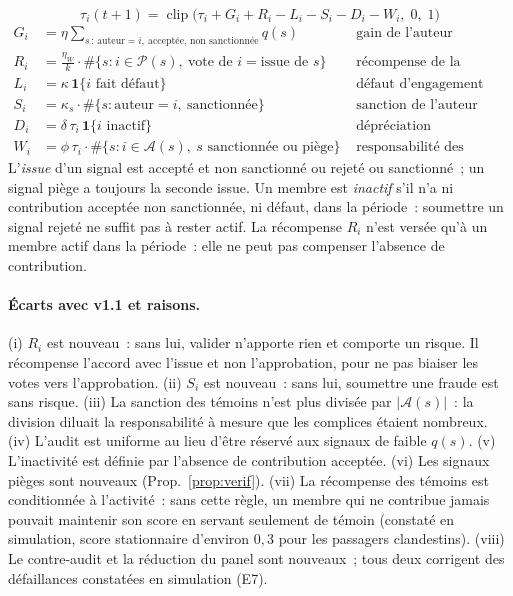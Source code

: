 \documentclass[11pt,a4paper]{article}
\theoremstyle{plain}
\theoremstyle{definition}
\theoremstyle{remark}
\newcommand{\clip}{\operatorname{clip}}
\newcommand{\1}{\mathbf{1}}
\begin{document}
\begin{equation}
\boxed{\tau_i(t+1)=\clip\bigl(\tau_i+G_i+R_i-L_i-S_i-D_i-W_i,\;0,\;1\bigr)}
\label{eq:dyn}
\end{equation}
\begin{align}
G_i&=\eta\textstyle\sum_{s\,:\,\text{auteur}=i,\ \text{acceptée, non sanctionnée}}q(s)
  &&\text{gain de l'auteur}\label{eq:G}\\
R_i&=\tfrac{\eta_W}{k}\cdot\#\{s: i\in\mathcal{P}(s),\ \text{vote de } i=\text{issue de } s\}
  &&\text{récompense de la majorité}\label{eq:R}\\
L_i&=\kappa\,\1\{i\text{ fait défaut}\}&&\text{défaut d'engagement}\label{eq:L}\\
S_i&=\kappa_s\cdot\#\{s:\text{auteur}=i,\ \text{sanctionnée}\}&&\text{sanction de l'auteur}\label{eq:S}\\
D_i&=\delta\,\tau_i\,\1\{i\text{ inactif}\}&&\text{dépréciation}\label{eq:D}\\
W_i&=\phi\,\tau_i\cdot\#\{s: i\in\mathcal{A}(s),\ s\text{ sanctionnée ou piège}\}
  &&\text{responsabilité des témoins}\label{eq:W}
\end{align}
L'\emph{issue} d'un signal est \og{}accepté et non sanctionné\fg{} ou
\og{}rejeté ou sanctionné\fg{}~; un signal piège a toujours la seconde issue.
Un membre est \emph{inactif} s'il n'a ni contribution acceptée non sanctionnée,
ni défaut, dans la période~: soumettre un signal rejeté ne suffit pas à rester
actif. La récompense $R_i$ n'est versée qu'à un membre actif dans la période~:
elle ne peut pas compenser l'absence de contribution.

\paragraph{Écarts avec v1.1 et raisons.} (i) $R_i$ est nouveau~: sans lui,
valider n'apporte rien et comporte un risque. Il récompense l'accord avec
l'issue et non l'approbation, pour ne pas biaiser les votes vers
l'approbation. (ii) $S_i$ est nouveau~: sans lui, soumettre une fraude est sans
risque. (iii) La sanction des témoins n'est plus divisée par $|\mathcal{A}(s)|$~:
la division diluait la responsabilité à mesure que les complices étaient
nombreux. (iv) L'audit est uniforme au lieu d'être réservé aux signaux de
faible $q(s)$. (v) L'inactivité est définie par l'absence de contribution
acceptée. (vi) Les signaux pièges sont nouveaux (Prop.~\ref{prop:verif}).
(vii) La récompense des témoins est conditionnée à l'activité~: sans cette
règle, un membre qui ne contribue jamais pouvait maintenir son score en
servant seulement de témoin (constaté en simulation, score stationnaire
d'environ $0{,}3$ pour les passagers clandestins). (viii) Le contre-audit et
la réduction du panel sont nouveaux~; tous deux corrigent des défaillances
constatées en simulation (E7).
\end{document}
